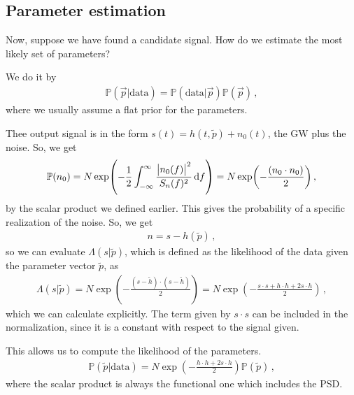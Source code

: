 \documentclass[main.tex]{subfiles}
\begin{document}
\subsection{Parameter estimation}


Now, suppose we have found a candidate signal. How do we estimate the most likely set of parameters?

We do it by 
%
\begin{align}
\mathbb{P}(\vec{p} | \text{data}) = \mathbb{P} (\text{data} | \vec{p}) \mathbb{P} (\vec{p})
\,,
\end{align}
%
where we usually assume a flat prior for the parameters.

Thee output signal is in the form \(s(t) = h (t, \widetilde{p}) + n_0 (t)\), the GW plus the noise. So, we get  
%
\begin{align}
\mathbb{P}(n_0 ) = N \exp( - \frac{1}{2} \int_{- \infty }^{ \infty } \frac{\abs{n_0 (f)}^2}{S_n(f)^2} \dd{f}) = N \exp( -\frac{(n_0 \cdot n_0 )}{2})
\,,
\end{align}
%
by the scalar product we defined earlier.
This gives the probability of a specific realization of the noise. So, we get 
%
\begin{align}
n= s - h (\widetilde{p}) 
\,,
\end{align}
%
so we can evaluate \(\Lambda (s | \widetilde{p})\), which is defined as the likelihood of the data given the parameter vector \(\widetilde{p}\), as 
%
\begin{align}
\Lambda (s| \widetilde{p})
= N \exp( -\frac{(s - \widetilde{h}) \cdot (s - \widetilde{h})}{2})
= N \exp(- \frac{s \cdot s + h \cdot h + 2 s \cdot h}{2})
\,,
\end{align}
%
which we can calculate explicitly.
The term given by \(s \cdot s\) can be included in the normalization, since it is a constant with respect to the signal given. 

This allows us to compute the likelihood of the parameters. 
%
\begin{align}
\mathbb{P}(\widetilde{p} | \text{data}) = 
N \exp(- \frac{h \cdot h + 2 s \cdot h}{2}) \mathbb{P}(\widetilde{p})
\,,
\end{align}
%
where the scalar product is always the functional one which includes the PSD.
\end{document}
